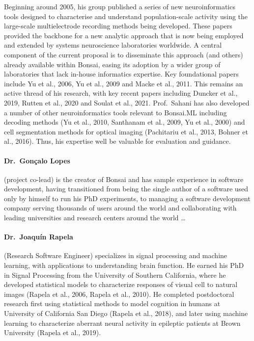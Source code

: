 Beginning around 2005, his group published a series of new neuroinformatics
tools designed to characterise and understand population-scale activity using
the large-scale multielectrode recording methods being developed. These papers
provided the backbone for a new analytic approach that is now being employed
and extended by systems neuroscience laboratories worldwide. A central
component of the current proposal is to disseminate this approach (and others)
already available within Bonsai, easing its adoption by a wider group of
laboratories that lack in-house informatics expertise. Key foundational papers
include Yu et al., 2006, Yu et al., 2009 and Macke et al., 2011.
%
This remains an active thread of his research, with key recent papers including
Duncker et al., 2019, Rutten et al., 2020 and Soulat et al., 2021.
%
Prof.~Sahani has also developed a number of other neuroinformatics tools
relevant to Bonsai.ML including decoding methods (Yu et al., 2010, Santhanam et
al., 2009, Yu et al., 2000) and cell segmentation methods for optical imaging
(Pachitariu et al., 2013, Bohner et al., 2016). Thus, his expertise well be
valuable for evaluation and guidance.

\paragraph{Dr.~Gon\c{c}alo Lopes} (project co-lead) is the creator of Bonsai and
has sample experience in software development, having transitioned from being
the single author of a software used only by himself to run his PhD
experiments, to managing a software development company serving thousands of
users around the world and collaborating with leading universities and research
centers around the world \ldots

\paragraph{Dr.~Joaquín Rapela} (Research Software Engineer) specializes in
signal processing and machine learning, with applications to understanding
brain function. He earned his PhD in Signal Processing from the University of
Southern California, where he developed statistical models to characterize
responses of visual cell to natural images (Rapela et al., 2006, Rapela et al.,
2010). He completed postdoctoral research first using statistical methods to
model cognition in humans at University of California San Diego (Rapela et al.,
2018), and later using machine learning to characterize aberrant neural
activity in epileptic patients at Brown University (Rapela et al., 2019).

